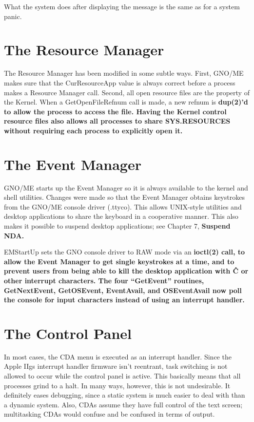 \documentclass{report}
\begin{document}
What the system does after displaying the
message is the same as for a system panic.


\section{The Resource Manager}

The Resource Manager has been modified in
some subtle ways. First, GNO/ME makes sure that the
CurResourceApp value is always correct before a process makes a
Resource Manager call. Second, all open resource files are the
property of the Kernel. When a GetOpenFileRefnum call is made, a
new refnum is \bf dup\rm(2)'d to allow the process to access the
file. Having the Kernel control resource files also allows all
processes to share SYS.RESOURCES without requiring each process
to explicitly open it.

\section{The Event Manager}


GNO/ME starts up the Event Manager so it is
always available to the kernel and shell utilities. Changes were
made so that the Event Manager obtains keystrokes from the GNO/ME
console driver (.ttyco). This allows UNIX-style utilities and
desktop applications to share the keyboard in a cooperative
manner. This also makes it possible to suspend desktop
applications; see Chapter 7, \bf Suspend NDA\rm.

EMStartUp sets the GNO console driver to
RAW mode via an \bf ioctl\rm(2) call, to allow the Event Manager
to get single keystrokes at a time, and to prevent users from
being able to kill the desktop application with \^C or other
interrupt characters. The four ``GetEvent'' routines,
GetNextEvent, GetOSEvent, EventAvail, and OSEventAvail now poll
the console for input characters instead of using an interrupt
handler.

\section{The Control Panel}

In most cases, the CDA menu is executed as
an interrupt handler. Since the Apple IIgs interrupt handler
firmware isn't reentrant, task switching is not allowed to occur
while the control panel is active. This basically means that all
processes grind to a halt. In many ways, however, this is not
undesirable. It definitely eases debugging, since a static system
is much easier to deal with than a dynamic system. Also, CDAs
assume they have full control of the text screen; multitasking
CDAs would confuse and be confused in terms of output.
\end{document}
